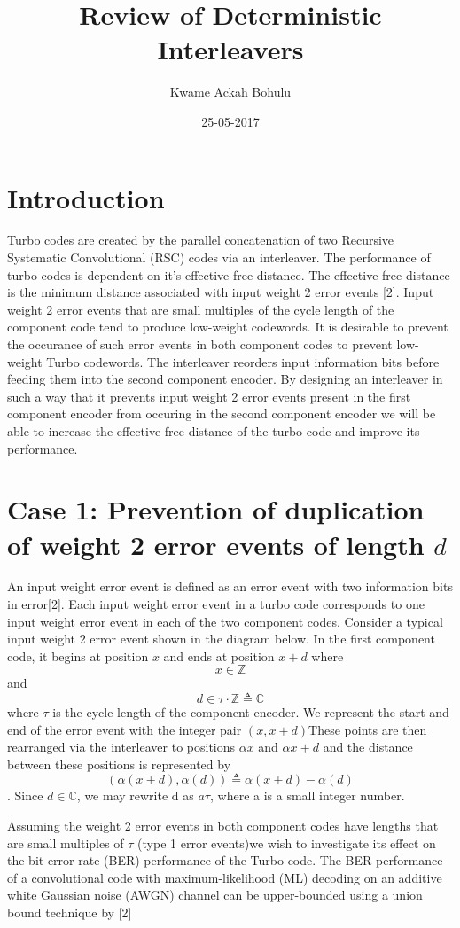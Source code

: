 \documentclass[20 pts]{article}
\title{Review of Deterministic Interleavers}
\author{Kwame Ackah Bohulu}
\date{25-05-2017}
\begin{document}
\maketitle


\section{Introduction}
Turbo codes are created by the parallel concatenation of two Recursive Systematic Convolutional (RSC) codes via an interleaver. The performance of turbo codes is dependent on it's effective free distance. The effective free distance is the minimum distance associated with input weight 2 error events [2]. Input weight 2 error events that are small multiples of the cycle length of the component code tend to produce low-weight codewords. It is desirable to prevent the occurance of such error events in both component codes to prevent low-weight Turbo codewords. The interleaver reorders input information bits  before feeding them into the second component encoder. By designing an interleaver in such a way that it prevents input weight 2 error events present in the first component encoder from occuring in the second component encoder we will be able to increase the effective free distance of the turbo code and improve its performance. 

\section{Case 1: Prevention of duplication of weight 2 error events of length $d$}
An input weight error event is defined as an error event with two information bits in error[2]. Each input weight error event in a turbo code corresponds to one input weight error event in each of the two component codes. Consider a typical input weight 2 error event shown in the diagram below. In the first component code, it begins at position $x$ and ends at position $x+d$ where $$x \in \mathbb{Z}$$ and $$d \in \tau \cdot \mathbb{Z} \triangleq \mathbb{C}$$ where $\tau$ is the cycle length of the component encoder. We represent the start and end of the error event with the integer pair $(x,x+d)$These points are then rearranged via the interleaver to positions $\alpha{x}$ and $\alpha{x+d}$ and the distance between these positions is represented by $$(\alpha(x+d),\alpha(d)) \triangleq \alpha(x+d) - \alpha(d) $$. Since $d \in \mathbb{C}$, we may rewrite d as $a\tau$, where a is a small integer number. 

Assuming the weight 2 error events in both component codes have lengths that are small multiples of $\tau$ (type 1 error events)we wish to investigate its effect on the bit error rate (BER) performance of the Turbo code. 
The BER performance of a convolutional code with maximum-likelihood (ML) decoding on an additive white Gaussian noise (AWGN) channel can be upper-bounded
using a union bound technique by [2]
\end{document}
